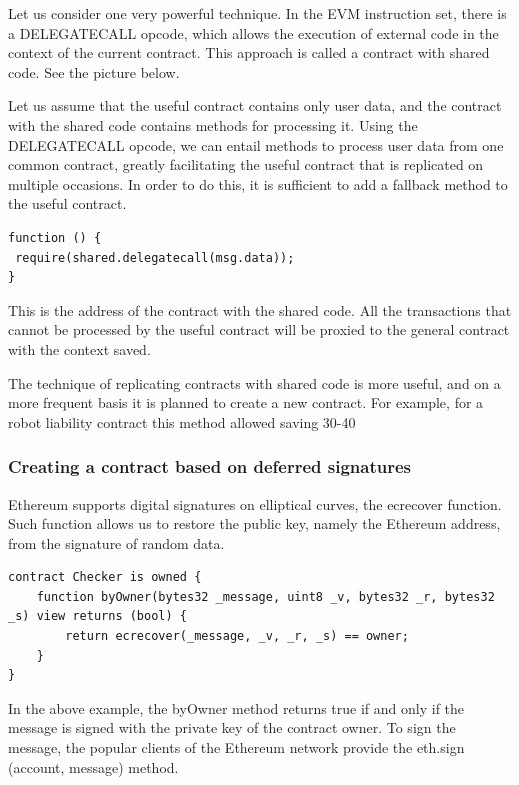 \documentclass{article}
\begin{document}
Let us consider one very powerful technique. In the EVM instruction set, there is a DELEGATECALL opcode, which allows the execution of external code in the context of the current contract. This approach is called a contract with shared code. See the picture below.

Let us assume that the useful contract contains only user data, and the contract with the shared code contains methods for processing it. Using the DELEGATECALL opcode, we can entail methods to process user data from one common contract, greatly facilitating the useful contract that is replicated on multiple occasions. In order to do this, it is sufficient to add a fallback method to the useful contract.

\begin{lstlisting}
function () {
 require(shared.delegatecall(msg.data));
}
\end{lstlisting}

This is the address of the contract with the shared code. All the transactions that cannot be processed by the useful contract will be proxied to the general contract with the context saved.

The technique of replicating contracts with shared code is more useful, and on a more frequent basis it is planned to create a new contract. For example, for a robot liability contract this method allowed saving 30-40%

\subsubsection{Creating a contract based on deferred signatures}

Ethereum supports digital signatures on elliptical curves, the ecrecover function. Such function allows us to restore the public key, namely the Ethereum address, from the signature of random data.

\begin{lstlisting}
contract Checker is owned {
    function byOwner(bytes32 _message, uint8 _v, bytes32 _r, bytes32 _s) view returns (bool) {
        return ecrecover(_message, _v, _r, _s) == owner;
    }
}
\end{lstlisting}

In the above example, the byOwner method returns true if and only if the message is signed with the private key of the contract owner. To sign the message, the popular clients of the Ethereum network provide the eth.sign (account, message) method.
\end{document}
